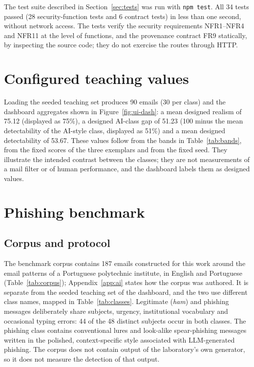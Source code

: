 The test suite described in Section~\ref{sec:tests} was run with \texttt{npm test}. All 34 tests passed (28 security-function tests and 6 contract tests) in less than one second, without network access. The tests verify the security requirements NFR1--NFR4 and NFR11 at the level of functions, and the provenance contract FR9 statically, by inspecting the source code; they do not exercise the routes through HTTP.

\section{Configured teaching values}
\label{sec:eval-config}

Loading the seeded teaching set produces 90 emails (30 per class) and the dashboard aggregates shown in Figure~\ref{fig:ui-dash}: a mean designed realism of 75.12 (displayed as 75\%), a designed AI-class gap of 51.23 (100 minus the mean detectability of the AI-style class, displayed as 51\%) and a mean designed detectability of 53.67. These values follow from the bands in Table~\ref{tab:bands}, from the fixed scores of the three exemplars and from the fixed seed. They illustrate the intended contrast between the classes; they are not measurements of a mail filter or of human performance, and the dashboard labels them as designed values.

\section{Phishing benchmark}
\label{sec:eval-phish}

\subsection{Corpus and protocol}

The benchmark corpus contains 187 emails constructed for this work around the email patterns of a Portuguese polytechnic institute, in English and Portuguese (Table~\ref{tab:corpus}); Appendix~\ref{app:ai} states how the corpus was authored. It is separate from the seeded teaching set of the dashboard, and the two use different class names, mapped in Table~\ref{tab:classes}. Legitimate (\emph{ham}) and phishing messages deliberately share subjects, urgency, institutional vocabulary and occasional typing errors: 44 of the 48 distinct subjects occur in both classes. The phishing class contains conventional lures and look-alike spear-phishing messages written in the polished, context-specific style associated with LLM-generated phishing. The corpus does not contain output of the laboratory's own generator, so it does not measure the detection of that output.

